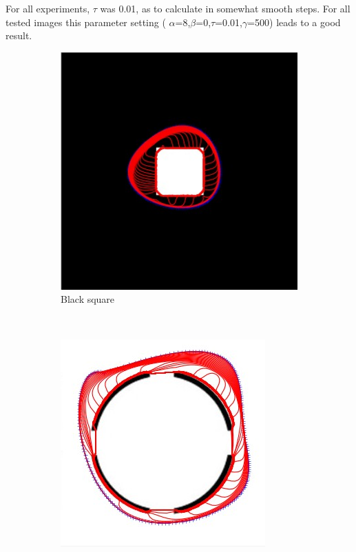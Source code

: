 \documentclass[paper=a4, fontsize=11pt]{scrartcl} %
\numberwithin{equation}{section} %
\numberwithin{figure}{section} %
\numberwithin{table}{section} %
\begin{document}
For all experiments, $\tau$ was 0.01, as to calculate in somewhat smooth steps. For all tested images this parameter setting ( $\alpha$=8,$\beta$=0,$\tau$=0.01,$\gamma$=500) leads to a good result.\\
\begin{figure}[H]
        \centering
        \begin{subfigure}[b]{0.2\textwidth}
                \includegraphics[width=\textwidth]{108}
                \caption{Black square}
                \label{fig:Blacksquare}
        \end{subfigure}%
        ~ %
        \begin{subfigure}[b]{0.2\textwidth}
                \includegraphics[width=\textwidth]{301}

\end{subfigure}
\end{figure}
\end{document}
